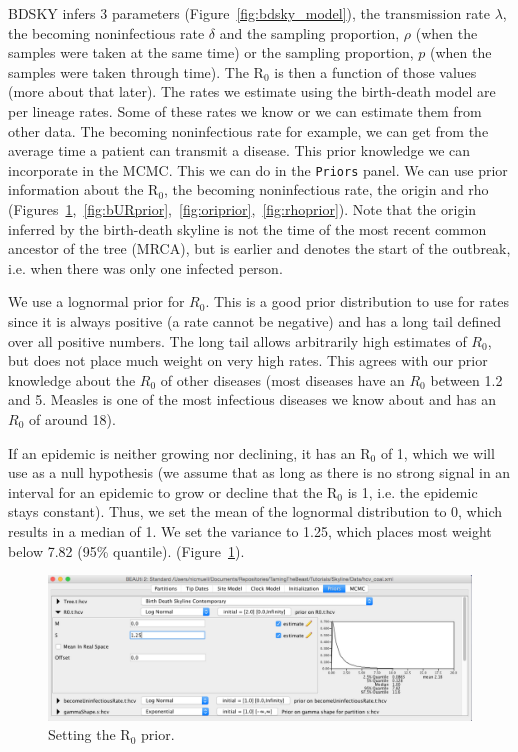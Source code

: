 \documentclass[11pt]{article}
\newcommand{\fixme}[1]{\textcolor{red}{\texttt{{\bf FIX ME:} #1}}}
\begin{document}
BDSKY infers 3 parameters (Figure~\ref{fig:bdsky_model}), the transmission rate $\lambda$, the becoming noninfectious rate $\delta$ and the sampling proportion, $\rho$ (when the samples were taken at the same time) or the sampling proportion, $p$ (when the samples were taken through time). The R$_{0}$ is then a function of those values (more about that later).
The rates we estimate using the birth-death model are per lineage rates. Some of these rates we know or we can estimate them from other data. The becoming noninfectious rate for example, we can get from the average time a patient can transmit a disease. This prior knowledge we can incorporate in the MCMC.
This we can do in the \texttt{Priors} panel. We can use prior information about the R$_{0}$, the becoming noninfectious rate, the origin and rho (Figures~\ref{fig:r0prior},~\ref{fig:bURprior},~\ref{fig:oriprior},~\ref{fig:rhoprior}). Note that the origin inferred by the birth-death skyline is not the time of the most recent common ancestor of the tree (MRCA), but is earlier and denotes the start of the outbreak, i.e. when there was only one infected person. 



We use a lognormal prior for $R_0$. This is a good prior distribution to use for rates since it is always positive (a rate cannot be negative) and has a long tail defined over all positive numbers. The long tail allows arbitrarily high estimates of $R_0$, but does not place much weight on very high rates. This agrees with our prior knowledge about the $R_0$ of other diseases (most diseases have an $R_0$ between 1.2 and 5. Measles is one of the most infectious diseases we know about and has an $R_0$ of around 18). 

If an epidemic is neither growing nor declining, it has an R$_{0}$ of 1, which we will use as a null hypothesis (we assume that as long as there is no strong signal in an interval for an epidemic to grow or decline that the R$_{0}$ is 1, i.e. the epidemic stays constant). Thus, we set the mean of the lognormal distribution to 0, which results in a median of 1. We set the variance to 1.25, which places most weight below 7.82 (95\% quantile). (Figure~\ref{fig:r0prior}).

\begin{figure}[h!]
\centering
\includegraphics[width=\textwidth]{figures/bdsky_prior_r0.png}
\caption{\small Setting the R$_{0}$ prior.}
\label{fig:r0prior}
\end{figure}
\end{document}
